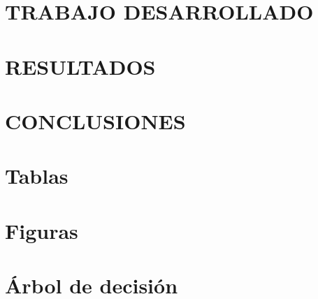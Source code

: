 \documentclass[pdftex]{pucthesis}	%
\begin{document}
\chapter[TRABAJO DESARROLLADO]{TRABAJO DESARROLLADO} \label{ch3}

\endgroup

\par\bigskip     
\begingroup
\let\clearpage\relax 
\chapter[RESULTADOS]{RESULTADOS} \label{ch4}

\endgroup


\par\bigskip     
\begingroup
\let\clearpage\relax 
\chapter[CONCLUSIONES]{CONCLUSIONES}

\endgroup


\cleardoublepage
{} \label{references}

\renewcommand{\bibname}{BIBLIOGRAFÍA}






\clearpage            %
\appendix             %

\chapter{Tablas}\label{app:tablas}


\chapter{Figuras}\label{app:figuras}


\chapter{Árbol de decisión}\label{app:Árbol de decisión}

\end{document}
